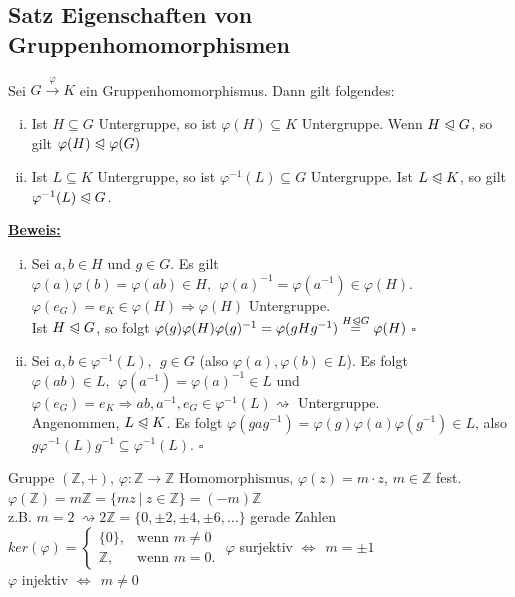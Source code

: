 \documentclass[a4paper, pagesize=pdftex, pdftex, twoside, headsepline, index=totoc,toc=listof, fontsize=10pt, cleardoublepage=empty, headinclude, DIV=13, BCOR=13mm]{scrartcl}
\newcommand{\bet}[1]{\uline{\textbf{#1}}} %
\newcommand{\nt}{\trianglelefteqslant} %
\begin{document}
\subsection{Satz Eigenschaften von Gruppenhomomorphismen}
\label{sub:satz_eigenschaften}
Sei $G\stackrel{\varphi}{\to}K $ ein Gruppenhomomorphismus. Dann gilt folgendes:
\begin{enumerate}[(i)]
	\item Ist $H\subseteq G$ Untergruppe, so ist $\varphi(H) \subseteq K$ Untergruppe. Wenn $H\trianglelefteqslant G$, so gilt $\varphi(H)\trianglelefteqslant\varphi(G)$
	\item Ist $L\subseteq K$ Untergruppe, so ist $\varphi^{-1}(L) \subseteq G$ Untergruppe. Ist $L\trianglelefteqslant K$, so gilt $\varphi^{-1}(L) \trianglelefteqslant G$.
\end{enumerate}
\newpage
\bet{Beweis:}\\
\begin{enumerate}[(i)]
	\item Sei $a,b\in H$ und $g\in G$. Es gilt $\varphi(a)\varphi(b)=\varphi(ab)\in H,~~\varphi(a)^{-1}=\varphi(a^{-1})\in \varphi(H) $. $\varphi(e_G)=e_K \in \varphi(H) \Rightarrow \varphi(H)$ Untergruppe.\\
	Ist $H\trianglelefteqslant G$, so folgt $\varphi(g)\varphi(H)\varphi(g)^{-1}=\varphi(gHg^{-1})\stackrel{H\trianglelefteqslant G}{=}\varphi(H)$
	\hfill $\square$
	\item Sei $a,b \in \varphi^{-1}(L),~~g \in G$ (also $\varphi(a),\varphi(b) \in L$). Es folgt $\varphi(ab)\in L,~~\varphi(a^{-1})=\varphi(a)^{-1}\in L$ und $\varphi(e_G)=e_K \Rightarrow ab, a^{-1},e_G \in \varphi^{-1}(L) \rightsquigarrow$ Untergruppe.\\
	Angenommen, $L\nt K$. Es folgt $\varphi(gag^{-1})=\varphi(g)\varphi(a)\varphi(g^{-1}) \in L$, also $g\varphi^{-1}(L)g^{-1} \subseteq \varphi^{-1}(L)$.
	\hfill $\square$
\end{enumerate}

Gruppe $(\mathds{Z},+)$, $\varphi: \mathds{Z} \to \mathds{Z} \text{ Homomorphismus, }\varphi(z)=m\cdot z$, $m \in \mathds{Z}$ fest.\\
$\varphi(\mathds{Z})=m\mathds{Z}=\{mz~|~z\in \mathds{Z}\}=(-m)\mathds{Z}$\\
z.B. $m=2~\rightsquigarrow 2\mathds{Z}=\{0,\pm 2,\pm 4,\pm 6,\dots\}$ gerade Zahlen\\
$ker(\varphi)=\left\{\begin{array}{cl} \{0\}, & \text{wenn }m\not=0\\ \mathds{Z}, & \text{wenn } m=0. \end{array}\right.$
$\varphi$ surjektiv $\Leftrightarrow~~m=\pm 1$\\
$\varphi$ injektiv $\Leftrightarrow~~m\not=0$\\
\end{document}
